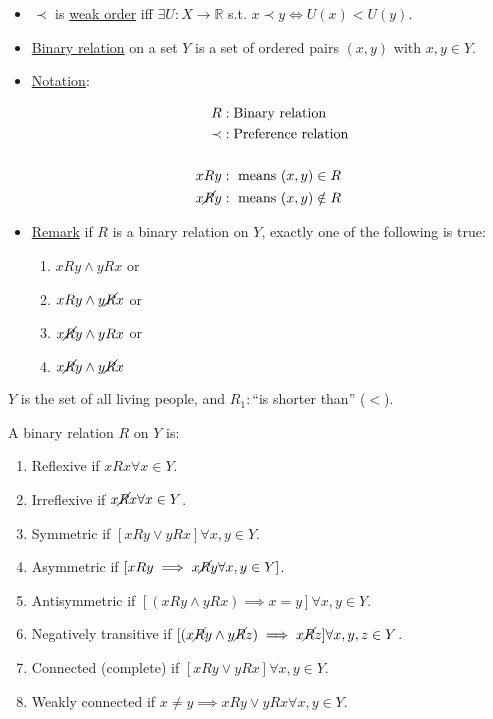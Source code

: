 \documentclass{article}
\def\reals{\mathbb{R}}
\def\noR{\cancel{R}}
\begin{document}
\begin{itemize}
\item $\prec$ is \underline{weak order} iff $\exists U:X\to\reals$ s.t. $x\prec y
\iff U(x)<U(y)$.

\item \underline{Binary relation} on a set $Y$ is a set of ordered pairs $(x,y)$
with $x,y\in Y$.

\item \underline{Notation}:

\begin{align*}
R&:\text{Binary relation} \\
\prec&:\text{Preference relation}\\\\
xRy&: \text{ means }(x,y) \in R \\
x\noR y&:\text{ means }(x,y)\notin R
\end{align*}

\item \underline{Remark} if $R$ is a binary relation on $Y$, exactly one of the
following is true:
\begin{enumerate}
\item $xRy \wedge yRx$ or 
\item $xRy \wedge y\noR x$ or 
\item $x\noR y \wedge yRx$ or 
\item $x\noR y \wedge y\noR x$

\end{enumerate}
\end{itemize}

 $Y$ is the set of all living people, and $R_1:$``is shorter
than'' ($<$).

 A binary relation $R$ on $Y$ is:
\begin{enumerate}
\item Reflexive if $xRx \forall x\in Y$.
\item Irreflexive if $x\cancel{R}x \forall x\in Y$.
\item Symmetric if $[xRy \vee yRx] \forall x,y\in Y$.
\item Asymmetric if $[xRy\implies x\noR y \forall x,y\in Y]$.
\item Antisymmetric if $[(xRy \wedge yRx)\implies x=y] \forall x,y\in Y$.
\item Negatively transitive if $[(x\noR y \wedge y\noR z)\implies x\noR z] \forall
x,y,z\in Y$.
\item Connected (complete) if $[xRy \vee yRx] \forall x,y\in Y$.
\item Weakly connected if $x\not=y\implies xRy \vee yRx\forall x,y\in Y$.
\end{enumerate}
\end{document}
